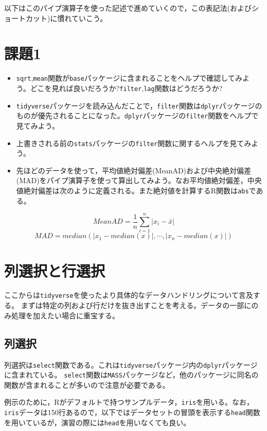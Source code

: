 \documentclass[
  a4paper,
]{ltjsbook}
\providecommand{\tightlist}{%
  \setlength{\itemsep}{0pt}\setlength{\parskip}{0pt}}\usepackage{longtable,booktabs,array}
\begin{document}
以下はこのパイプ演算子を使った記述で進めていくので，この表記法(およびショートカット)に慣れていこう。

\section{課題1}\label{ux8ab2ux984c1}

\begin{itemize}
\tightlist
\item
  \texttt{sqrt},\texttt{mean}関数が\texttt{base}パッケージに含まれることをヘルプで確認してみよう。どこを見れば良いだろうか?\texttt{filter},\texttt{lag}関数はどうだろうか?
\item
  \texttt{tidyverse}パッケージを読み込んだことで，\texttt{filter}関数は\texttt{dplyr}パッケージのものが優先されることになった。\texttt{dplyr}パッケージの\texttt{filter}関数をヘルプで見てみよう。
\item
  上書きされる前の\texttt{stats}パッケージの\texttt{filter}関数に関するヘルプを見てみよう。
\item
  先ほどのデータを使って，平均値絶対偏差(MeanAD)および中央絶対偏差(MAD)をパイプ演算子を使って算出してみよう。なお平均値絶対偏差，中央値絶対偏差は次のように定義される。また絶対値を計算するR関数は\texttt{abs}である。
\end{itemize}

\[MeanAD = \frac{1}{n}\sum_{i=1}^n|x_i - \bar{x}|\]
\[MAD = median(|x_1-median(x)|,\cdots,|x_n-median(x)|)\]

\section{列選択と行選択}\label{ux5217ux9078ux629eux3068ux884cux9078ux629e}

ここからは\texttt{tidyverse}を使ったより具体的なデータハンドリングについて言及する。
まずは特定の列および行だけを抜き出すことを考える。データの一部にのみ処理を加えたい場合に重宝する。

\subsection{列選択}\label{ux5217ux9078ux629e}

列選択は\texttt{select}関数である。これは\texttt{tidyverse}パッケージ内の\texttt{dplyr}パッケージに含まれている。
\texttt{select}関数は\texttt{MASS}パッケージなど，他のパッケージに同名の関数が含まれることが多いので注意が必要である。

例示のために，Rがデフォルトで持つサンプルデータ，\texttt{iris}を用いる。なお，\texttt{iris}データは150行あるので，以下ではデータセットの冒頭を表示する\texttt{head}関数を用いているが，演習の際には\texttt{head}を用いなくても良い。
\end{document}
